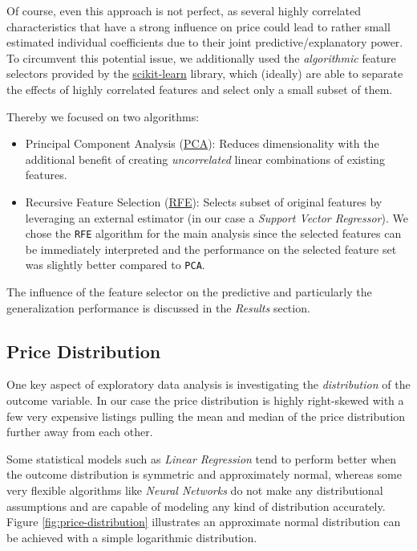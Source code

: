 \documentclass[12pt, letterpaper]{article}
\begin{document}
\begin{appendices}
    Of course, even this approach is not perfect, as several highly correlated characteristics that have a strong influence on price could lead to rather small estimated individual coefficients due to their joint predictive/explanatory power.
    To circumvent this potential issue, we additionally used the \emph{algorithmic} feature selectors provided by the \href{https://scikit-learn.org/stable/index.html}{scikit-learn} library, which (ideally) are able to separate the effects of highly correlated features and select only a small subset of them.

    Thereby we focused on two algorithms:
    \begin{itemize}
        \item Principal Component Analysis (\href{https://scikit-learn.org/stable/modules/generated/sklearn.decomposition.PCA.html}{PCA}):
              Reduces dimensionality with the additional benefit of creating \emph{uncorrelated} linear combinations of existing features.
        \item Recursive Feature Selection (\href{https://scikit-learn.org/stable/modules/generated/sklearn.feature_selection.RFE.html}{RFE}):
              Selects subset of original features by leveraging an external estimator (in our case a \emph{Support Vector Regressor}).
              We chose the \texttt{RFE} algorithm for the main analysis since the selected features can be immediately interpreted and the performance on the selected feature set was slightly better compared to \texttt{PCA}.

    \end{itemize}

    The influence of the feature selector on the predictive and particularly the generalization performance is discussed in the \emph{Results} section.

    \subsection{Price Distribution} \label{appendix:price-distribution}

    One key aspect of exploratory data analysis is investigating the \emph{distribution} of the outcome variable.
    In our case the price distribution is highly right-skewed with a few very expensive listings pulling the mean and median of the price distribution further away from each other.

    Some statistical models such as \emph{Linear Regression} tend to perform better when the outcome distribution is symmetric and approximately normal, whereas some very flexible algorithms like \emph{Neural Networks} do not make any distributional assumptions and are capable of modeling any kind of distribution accurately.
    Figure \ref{fig:price-distribution} illustrates an approximate normal distribution can be achieved with a simple logarithmic distribution.


\end{appendices}
\end{document}
